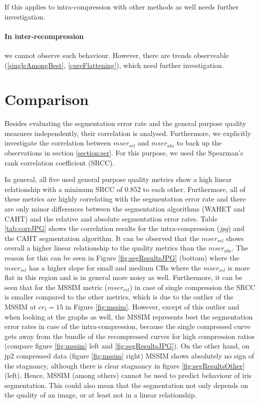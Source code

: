 \documentclass[10pt,twocolumn,letterpaper]{article}
\begin{document}
If this applies to intra-compression with other methods as well needs further investigation.

\paragraph{In inter-recompression} we cannot observe such behaviour. However, there are trends observeable (\ref{singleAmongBest}, \ref{cureFlattening}), which need further investigation. 


\section{Comparison}
\label{section:comparison}
Besides evaluating the segmentation error rate and the general purpose quality measures independently, their correlation is analysed. Furthermore, we explicitly investigate the correlation between $mser_{rel}$ and $mser_{abs}$ to back up the observations in section \ref{section:ser}.
For this purpose, we used the Spearman's rank correlation coefficient (SRCC).

In general, all five used general purpose quality metrics show a high linear relationship with a minimum SRCC of $0.852$ to each other. Furthermore, all of these metrics are highly correlating with the segmentation error rate and there are only minor differences between the segmentation algorithms (WAHET and CAHT) and the relative and absolute segmentation error rates. Table \ref{tab:corrJPG} shows the correlation results for the intra-compression (\emph{jpg}) and the CAHT segmentation algorithm. It can be observed that the $mser_{rel}$ shows overall a higher linear relationship to the quality metrics than the $mser_{abs}$. The reason for this can be seen in Figure \ref{fig:segResultsJPG} (bottom) where the $mser_{rel}$ has a higher slope for small and medium CRs where the $mser_{rel}$ is more flat in this region and is in general more noisy as well.
Furthermore, it can be seen that for the MSSIM metric ($mser_{rel}$) in case of single compression the SRCC is smaller compared to the other metrics, which is due to the outlier of the MSSIM at $cr_t = 15$ in Figure \ref{fig:mssim}. However, except of this outlier and when looking at the graphs as well, the MSSIM represents best the segmentation error rates in case of the intra-compression, because the single compressed curve gets away from the bundle of the recompressed curves for high compression ratios (compare figure \ref{fig:mssim} left and \ref{fig:segResultsJPG}).
On the other hand, on jp2 compressed data (figure \ref{fig:mssim} right) MSSIM shows absolutely no sign of the stagnancy, although there is clear stagnancy in figure \ref{fig:segResultsOther} (left). Hence, MSSIM (among others) cannot be used to predict behaviour of iris segmentation. This could also mean that the segmentation not only depends on the quality of an image, or at least not in a linear relationship. 
\end{document}
